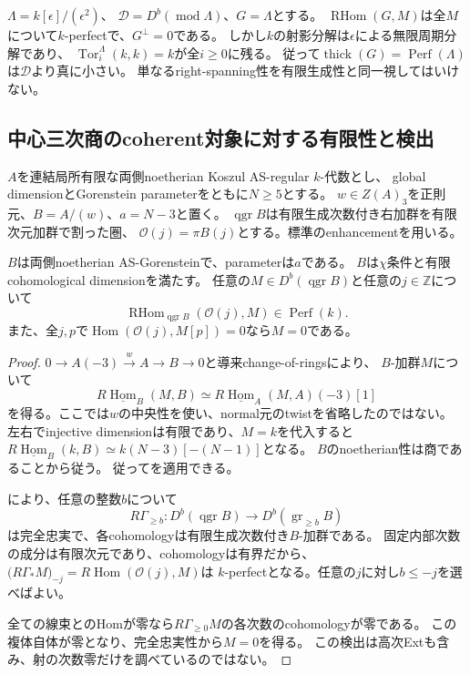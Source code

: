 \begin{example}[smoothnessを省けない]
$\Lambda=k[\epsilon]/(\epsilon^2)$、
$\mathcal D=D^b(\operatorname{mod}\Lambda)$、$G=\Lambda$とする。
$\operatorname{RHom}(G,M)$は全$M$について$k$-perfectで、$G^\perp=0$である。
しかし$k$の射影分解は$\epsilon$による無限周期分解であり、
$\operatorname{Tor}^{\Lambda}_i(k,k)=k$が全$i\ge0$に残る。
従って$\operatorname{thick}(G)=\operatorname{Perf}(\Lambda)$は$\mathcal D$より真に小さい。
単なるright-spanning性を有限生成性と同一視してはいけない。
\end{example}

\subsection{中心三次商のcoherent対象に対する有限性と検出}

$A$を連結局所有限な両側noetherian Koszul AS-regular $k$-代数とし、
global dimensionとGorenstein parameterをともに$N\ge5$とする。
$w\in Z(A)_3$を正則元、$B=A/(w)$、$a=N-3$と置く。
$\operatorname{qgr}B$は有限生成次数付き右加群を有限次元加群で割った圏、
$\mathcal O(j)=\pi B(j)$とする。標準のenhancementを用いる。

\begin{lemma}
\label{crs:lem:sections}
$B$は両側noetherian AS-Gorensteinで、parameterは$a$である。
$B$は$\chi$条件と有限cohomological dimensionを満たす。
任意の$M\in D^b(\operatorname{qgr}B)$と任意の$j\in\mathbb Z$について
\[
 \operatorname{RHom}_{\operatorname{qgr}B}(\mathcal O(j),M)
 \in\operatorname{Perf}(k).
 \tag{CS1}\label{crs:eq:finite-Hom}
\]
また、全$j,p$で$\operatorname{Hom}(\mathcal O(j),M[p])=0$なら$M=0$である。
\end{lemma}
\begin{proof}
$0\to A(-3)\xrightarrow{w}A\to B\to0$と導来change-of-ringsにより、
$B$-加群$M$について
\[
 R\underline{\operatorname{Hom}}_B(M,B)
 \simeq R\underline{\operatorname{Hom}}_A(M,A)(-3)[1]
\]
を得る。ここでは$w$の中央性を使い、normal元のtwistを省略したのではない。
左右でinjective dimensionは有限であり、$M=k$を代入すると
$R\underline{\operatorname{Hom}}_B(k,B)\simeq k(N-3)[-(N-1)]$となる。
$B$のnoetherian性は商であることから従う。
従って\cite[Lemmas~6.1--6.2]{CRSBS}を適用できる。

\cite[Proposition~4.18とその直前の導来随伴]{CRSBS}により、任意の整数$b$について
\[
 R\Gamma_{\ge b}:D^b(\operatorname{qgr}B)
 \longrightarrow D^b(\operatorname{gr}_{\ge b}B)
 \tag{CS2}\label{crs:eq:sections}
\]
は完全忠実で、各cohomologyは有限生成次数付き$B$-加群である。
固定内部次数の成分は有限次元であり、cohomologyは有界だから、
$\bigl(R\Gamma_*M\bigr)_{-j}=R\operatorname{Hom}(\mathcal O(j),M)$は
$k$-perfectとなる。任意の$j$に対し$b\le-j$を選べばよい。

全ての線束とのHomが零なら$R\Gamma_{\ge0}M$の各次数のcohomologyが零である。
この複体自体が零となり、完全忠実性から$M=0$を得る。
この検出は高次Extも含み、射の次数零だけを調べているのではない。
\end{proof}

